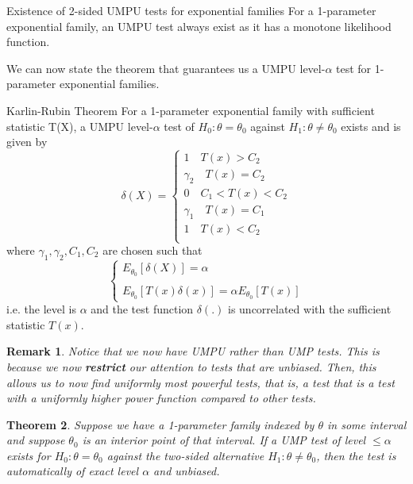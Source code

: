 \documentclass[twoside]{article}
\newcounter{lecnum}
\newtheorem{theorem}{Theorem}[lecnum]
\newtheorem{remark}[theorem]{Remark}
\begin{document}
\begin{theorem_exam}{Existence of 2-sided UMPU tests for exponential families}{}
For a 1-parameter exponential family, an UMPU test always exist as it has a monotone likelihood function.
\end{theorem_exam}
We can now state the theorem that guarantees us a UMPU level-$\alpha$ test for 1-parameter exponential families.
\begin{theorem_exam}{Karlin-Rubin Theorem}{} For a 1-parameter exponential family with sufficient statistic T(X), a UMPU level-$\alpha$ test of $H_0: \theta = \theta_0$ against $H_1: \theta \neq \theta_0$ exists and is given by 
$$
\delta(X) = 
\begin{cases}
1 \quad T(x) > C_2 \\
\gamma_2 \quad T(x) = C_2 \\
0 \quad C_1 < T(x) < C_2 \\
\gamma_1 \quad T(x) = C_1 \\
1 \quad T(x) < C_2 \\
\end{cases}
$$
where $\gamma_1, \gamma_2, C_1, C_2$ are chosen such that 
$$
\begin{cases}
E_{\theta_{0}}[\delta(X)] = \alpha \\
\\
E_{\theta_{0}}[T(x)\delta(x)] = \alpha E_{\theta_{0}}[T(x)]
\end{cases}
$$
i.e. the level is $\alpha$ and the test function $\delta(.)$ is uncorrelated with the sufficient statistic $T(x).$
\end{theorem_exam}

\begin{remark}Notice that we now have UMPU rather than UMP tests. This is because we now \textbf{restrict} our attention to tests that are unbiased. Then, this allows us to now find uniformly most powerful tests, that is, a test that is a test with a uniformly higher power function compared to other tests.
\end{remark}

\begin{theorem}Suppose we have a 1-parameter family indexed by $\theta$ in some interval and suppose $\theta_0$ is an interior point of that interval. If a UMP test of level $\leq \alpha$ exists for $H_0: \theta = \theta_0$ against the two-sided alternative $H_1: \theta \neq \theta_0$, then the test is automatically of exact level $\alpha$ and unbiased.
\end{theorem}
\end{document}

